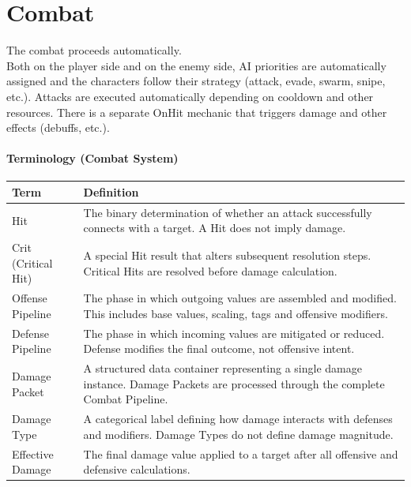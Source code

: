 \section{Combat}

The combat proceeds automatically. \\
Both on the player side and on the enemy side, AI priorities are automatically assigned and the characters follow their strategy (attack, evade, swarm, snipe, etc.). Attacks are executed automatically depending on cooldown and other resources. There is a separate OnHit mechanic that triggers damage and other effects (debuffs, etc.).

\paragraph{Terminology (Combat System)}
\begin{tabular}{l p{11.5cm}}
	\hline
	\textbf{Term} & \textbf{Definition} \\
	\hline
	Hit &	The binary determination of whether an attack successfully connects with a target.  
	A Hit does not imply damage. \\
	
	Crit (Critical Hit) &	A special Hit result that alters subsequent resolution steps.  
	Critical Hits are resolved before damage calculation. \\
	
	Offense Pipeline &	The phase in which outgoing values are assembled and modified.  
	This includes base values, scaling, tags and offensive modifiers. \\
	
	Defense Pipeline &	The phase in which incoming values are mitigated or reduced.  
	Defense modifies the final outcome, not offensive intent. \\
	
	Damage Packet &	A structured data container representing a single damage instance.  
	Damage Packets are processed through the complete Combat Pipeline. \\
	
	Damage Type &	A categorical label defining how damage interacts with defenses and modifiers.  
	Damage Types do not define damage magnitude. \\
	
	Effective Damage &	The final damage value applied to a target after all offensive and defensive calculations. \\
	\hline
\end{tabular}

